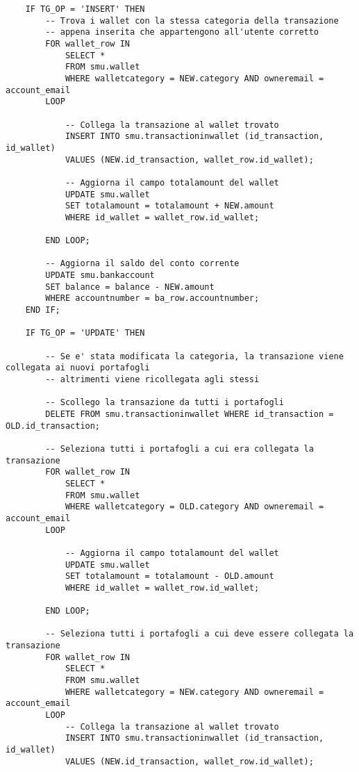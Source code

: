 \begin{lstlisting}
    IF TG_OP = 'INSERT' THEN
        -- Trova i wallet con la stessa categoria della transazione
        -- appena inserita che appartengono all'utente corretto
        FOR wallet_row IN
            SELECT *
            FROM smu.wallet
            WHERE walletcategory = NEW.category AND owneremail = account_email
        LOOP

            -- Collega la transazione al wallet trovato
            INSERT INTO smu.transactioninwallet (id_transaction, id_wallet)
            VALUES (NEW.id_transaction, wallet_row.id_wallet);

            -- Aggiorna il campo totalamount del wallet
            UPDATE smu.wallet
            SET totalamount = totalamount + NEW.amount
            WHERE id_wallet = wallet_row.id_wallet;

        END LOOP;

        -- Aggiorna il saldo del conto corrente
        UPDATE smu.bankaccount
        SET balance = balance - NEW.amount
        WHERE accountnumber = ba_row.accountnumber;
    END IF;

    IF TG_OP = 'UPDATE' THEN

        -- Se e' stata modificata la categoria, la transazione viene collegata ai nuovi portafogli
        -- altrimenti viene ricollegata agli stessi

        -- Scollego la transazione da tutti i portafogli
        DELETE FROM smu.transactioninwallet WHERE id_transaction = OLD.id_transaction;
        
        -- Seleziona tutti i portafogli a cui era collegata la transazione
        FOR wallet_row IN
            SELECT *
            FROM smu.wallet
            WHERE walletcategory = OLD.category AND owneremail = account_email
        LOOP

            -- Aggiorna il campo totalamount del wallet
            UPDATE smu.wallet
            SET totalamount = totalamount - OLD.amount
            WHERE id_wallet = wallet_row.id_wallet;

        END LOOP;

        -- Seleziona tutti i portafogli a cui deve essere collegata la transazione
        FOR wallet_row IN
            SELECT *
            FROM smu.wallet
            WHERE walletcategory = NEW.category AND owneremail = account_email
        LOOP
            -- Collega la transazione al wallet trovato
            INSERT INTO smu.transactioninwallet (id_transaction, id_wallet)
            VALUES (NEW.id_transaction, wallet_row.id_wallet);


\end{lstlisting}
